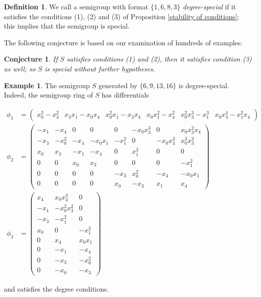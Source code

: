 \documentclass[twoside,12pt, leqno]{amsart}
\newtheorem{conjecture}[theorem]{Conjecture}
\theoremstyle{definition}
\newtheorem{definition}[theorem]{Definition}
\newtheorem{example}[theorem]{Example}
\begin{document}
\begin{definition}\label{degree-special def} We call a semigroup with format $\{1, 6, 8, 3\}$ \emph{degree-special}
if it satisfies the conditions (1), (2) and (3) of Proposition \ref{stability of conditions}; this implies that the semigroup is special.
\end{definition}

The following conjecture is based on our examination of hundreds of examples:
\begin{conjecture}\label{acyclity}
If $S$ satisfies conditions (1) and (2), then it satisfies condition (3) as well; so 
$S$ is special without further hypotheses.
\end{conjecture}

\begin{example} The semigroup $S$ generated by $\{6,9,13,16\}$ is degree-special.
 Indeed, the semigroup ring of  $S$ has differentials
 
\begin{small}
$$  
\begin{aligned}
\phi_{1}& = 
\begin{pmatrix}
 x_0^3-x_3^2 &x_3x_1-x_0x_4 &x_0^2x_1-x_3x_4 &x_0x_1^2-x_4^2 &x_0^2x_3^3-x_1^3& x_0x_3^4-x_1^2x_4 
\end{pmatrix}
\\
\phi_{2} &= 
\begin{pmatrix}
  -x_1& -x_4&   0&    0 &      0 &     -x_0x_3^3 &0  &       x_0x_3^2x_4 \\
-x_3 &-x_0^2& -x_4& -x_0x_1 &-x_1^2 &0    &     -x_0x_3^3& x_0^3x_3^2  \\
x_0 & x_3  &  -x_1 &-x_4   & 0  &    x_1^2  &   0   &      0           \\
0   & 0    &  x_0&  x_3 &    0  &    0     &    0      &   -x_1^2      \\
0  &  0 &     0 &   0   &    -x_3  & x_0^2   &  -x_4  &    -x_0x_1     \\
0  &  0  &    0   & 0&       x_0 &   -x_3 &     x_1 &      x_4         
\end{pmatrix}
\\
\phi_{3} &= 
\begin{pmatrix}
x_4 & x_0x_3^3  &  0      \\ 
 -x_1 &-x_0^2x_3^2 &0      \\
 -x_3 &-x_1^2  &    0      \\
 x_0  &0   &        -x_1^2 \\
 0   & x_4   &      x_0x_1 \\
 0   & -x_1   &     -x_4   \\
 0    &-x_3    &    -x_0^2\\
 0   & -x_0    &    -x_3   
\end{pmatrix}
\end{aligned}
$$
\end{small}
and satisfies the degree conditions.
 \end{example}
\end{document}
